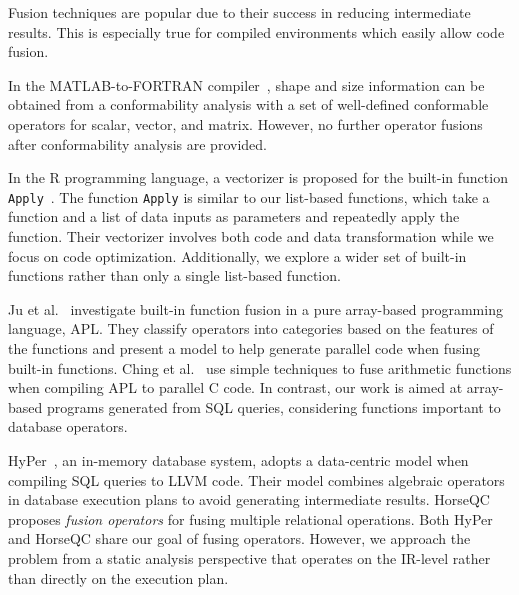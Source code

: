 
Fusion techniques are popular due to their success in reducing intermediate
results. This is especially true for compiled environments which easily
allow code fusion.

In the MATLAB-to-FORTRAN compiler~\cite{rose1999:techniques}, shape and size
information can be obtained from a conformability analysis with a set of
well-defined conformable operators for scalar, vector, and matrix.
However, no further operator fusions after conformability analysis are provided.

In the R programming language, a vectorizer is proposed for the built-in
function \texttt{Apply}~\cite{Wang2015:vectorization}. The function
\texttt{Apply} is similar to our list-based functions, which take
a function and a list of data inputs as parameters and repeatedly apply
the function. Their vectorizer involves both code and data transformation
while we focus on code optimization. Additionally, we explore a wider set
of built-in functions rather than only a single list-based function.

Ju et al.~\cite{ju1994:array} investigate built-in function fusion in a pure
array-based programming language, APL. They classify operators into categories
based on the features of the functions and present a model to help generate
parallel code when fusing built-in functions. Ching et al.~\cite{ChingZ12parallel}
use simple techniques to fuse arithmetic functions when compiling APL to parallel
C code. In contrast, our work is aimed at array-based programs generated from
SQL queries, considering functions important to database operators.

HyPer~\cite{Neumann2011:HyPer}, an in-memory database system, adopts a data-centric
model when compiling SQL queries to LLVM code. Their model combines algebraic
operators in database execution plans to avoid generating intermediate results.
HorseQC~\cite{FunkeBNMT18:HorseQC} proposes \textit{fusion operators} for
fusing multiple relational operations. Both HyPer and HorseQC share our goal
of fusing operators. However, we approach the problem from a static analysis
perspective that operates on the IR-level rather than directly on the execution plan.

